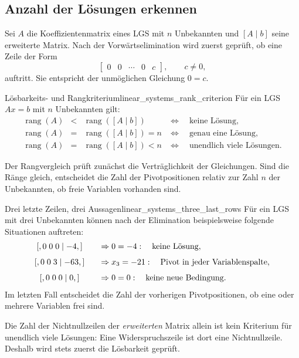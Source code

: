 \subsection{Anzahl der Lösungen erkennen}
\label{subsec:linear_systems_solution_criteria}

Sei $A$ die Koeffizientenmatrix eines LGS mit $n$ Unbekannten und
$[A\mid b]$ seine erweiterte Matrix. Nach der Vorwärtselimination wird zuerst
geprüft, ob eine Zeile der Form
\[
  \left[\begin{array}{cccc|c}
    0&0&\cdots&0&c
  \end{array}\right],
  \qquad c\neq0,
\]
auftritt. Sie entspricht der unmöglichen Gleichung $0=c$.

\begin{TheoremBox}{Lösbarkeits- und Rangkriterium}{linear_systems_rank_criterion}
  Für ein LGS $Ax=b$ mit $n$ Unbekannten gilt:
  \[
    \begin{array}{rcll}
      \operatorname{rang}(A)
      &<&\operatorname{rang}([A\mid b])
      &\Longleftrightarrow\quad \text{keine Lösung},\\[0.7em]
      \operatorname{rang}(A)
      &=&\operatorname{rang}([A\mid b])=n
      &\Longleftrightarrow\quad \text{genau eine Lösung},\\[0.7em]
      \operatorname{rang}(A)
      &=&\operatorname{rang}([A\mid b])<n
      &\Longleftrightarrow\quad \text{unendlich viele Lösungen}.
    \end{array}
  \]
\end{TheoremBox}

Der Rangvergleich prüft zunächst die Verträglichkeit der Gleichungen. Sind die
Ränge gleich, entscheidet die Zahl der Pivotpositionen relativ zur Zahl $n$
der Unbekannten, ob freie Variablen vorhanden sind.

\begin{center}
  
\end{center}

\begin{ExampleBox}{Drei letzte Zeilen, drei Aussagen}{linear_systems_three_last_rows}
  Für ein LGS mit drei Unbekannten können nach der Elimination beispielsweise
  folgende Situationen auftreten:
  \[
    \begin{array}{c@{\qquad}l}
      [,0\;0\;0\mid -4,]
        &\Rightarrow 0=-4:\quad \text{keine Lösung},\\[0.7em]
      [,0\;0\;3\mid -63,]
        &\Rightarrow x_3=-21:\quad \text{Pivot in jeder Variablenspalte},\\[0.7em]
      [,0\;0\;0\mid 0,]
        &\Rightarrow 0=0:\quad \text{keine neue Bedingung}.
    \end{array}
  \]
  Im letzten Fall entscheidet die Zahl der vorherigen Pivotpositionen, ob eine
  oder mehrere Variablen frei sind.
\end{ExampleBox}

\begin{RemarkBox}
  Die Zahl der Nichtnullzeilen der \emph{erweiterten} Matrix allein ist kein
  Kriterium für unendlich viele Lösungen: Eine Widerspruchszeile ist dort eine
  Nichtnullzeile. Deshalb wird stets zuerst die Lösbarkeit geprüft.
\end{RemarkBox}
